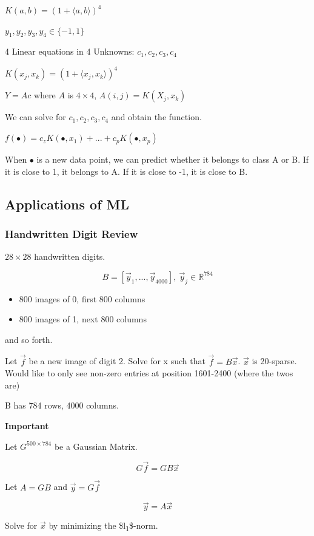 \documentclass[11pt]{article}
\begin{document}
\(K(a,b) = (1 + \langle a, b \rangle)^4\)

\(y_1, y_2, y_3, y_4 \in \{ -1, 1\}\)

4 Linear equations in 4 Unknowns: \(c_1, c_2, c_3, c_4\)

\(K(x_j, x_k) = (1 + \langle x_j, x_k \rangle)^4\)

\(Y = Ac\) where \(A\) is \(4 \times 4\), \(A(i,j) = K(X_j, x_k)\)

We can solve for \(c_1, c_2, c_3, c_4\) and obtain the function.

\(f(\bullet) = c_z K(\bullet, x_1) + ... + c_p K(\bullet, x_p)\)

When \(\bullet\) is a new data point, we can predict whether it belongs to class A
or B. If it is close to 1, it belongs to A. If it is close to -1, it is close to B.

\subsection{Applications of ML}
\label{sec:orge0ebe0d}
\subsubsection{Handwritten Digit Review}
\label{sec:orgda689a8}

\(28 \times 28\) handwritten digits.

$$
B = [\vec y_1, ..., \vec y_{4000}], \ \vec y_j \in \mathbb R^{784}
$$

\begin{itemize}
\item 800 images of 0, first 800 columns
\item 800 images of 1, next 800 columns
\end{itemize}

and so forth.

Let \(\vec f\) be a new image of digit 2. Solve for x such that \(\vec f = B \vec
x\). \(\vec x\) is 20-sparse. Would like to only see non-zero entries at position
1601-2400 (where the twos are)

B has 784 rows, 4000 columns.

\textbf{Important}

Let \(G^{500 \times 784}\) be a Gaussian Matrix.

$$
G \vec f = G B \vec x
$$

Let \(A = GB\) and \(\vec y = G \vec f\)

$$
\vec y = A \vec x
$$

Solve for \(\vec x\) by minimizing the \$l\textsubscript{1}\$-norm.
\end{document}
